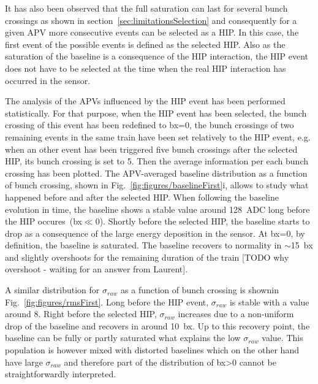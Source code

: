 It has also been observed that the full saturation can last for several bunch crossings as shown in section~\ref{sec:limitationsSelection} and consequently for a given APV more consecutive events can be selected as a HIP. In this case, the first event of the possible events is defined as the selected HIP. Also as the saturation of the baseline is a consequence of the HIP interaction, the HIP event does not have to be selected at the time when the real HIP interaction has occurred in the sensor. 


The analysis of the APVs influenced by the HIP event has been performed statistically. For that purpose, when the HIP event has been selected, the bunch crossing of this event has been redefined to bx=0, the bunch crossings of two remaining events in the same train have been set relatively to the HIP event, e.g. when an other event has been triggered five bunch crossings after the selected HIP, its bunch crossing is set to 5. Then the average information per each bunch crossing has been plotted. The APV-averaged baseline distribution as a function of bunch crossing, shown in Fig.~\ref{fig:figures/baselineFirst}i, allows to study what happened before and after the selected HIP. When following the baseline evolution in time, the baseline shows a stable value around 128~ADC long before the HIP occures~(bx$\ll$0). Shortly before the selected HIP, the baseline starts to drop as a consequence of the large energy deposition in the sensor. At bx=0, by definition, the baseline is saturated. The baseline recovers to normality in $\sim$15~bx and slightly overshoots for the remaining duration of the train [TODO why overshoot - waiting for an answer from Laurent].

A similar distribution for $\sigma_{raw}$  as a function of bunch crossing is shownin Fig.~\ref{fig:figures/rmsFirst}. Long before the HIP event, $\sigma_{raw}$ is stable with a value around 8. Right before the selected HIP, $\sigma_{raw}$ increases due to a non-uniform drop of the baseline and recovers in around 10~bx. Up to this recovery point, the baseline can be fully or partly saturated what explains the low $\sigma_{raw}$ value. This population is however mixed with distorted baselines which on the other hand have large $\sigma_{raw}$ and therefore part of the distribution of bx>0 cannot be straightforwardly interpreted.

